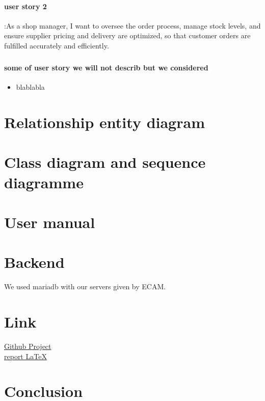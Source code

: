 \documentclass{article}
\begin{document}
\paragraph{user story 2}:As a shop manager, I want to oversee the order process, manage stock levels, and ensure supplier pricing and delivery are optimized, so that customer orders are fulfilled accurately and efficiently.
\subparagraph{}

\paragraph{some of user story we will not describ but we considered}
\begin{itemize}
    \item blablabla
\end{itemize}

\section{Relationship entity diagram}

\section{Class diagram and sequence diagramme}

\section{User manual}

\section{Backend}
We used mariadb with our servers given by ECAM.   

\section{Link}
\href{https://github.com/I42I/Kitbox_app}{Github Project}\\
\href{https://github.com/PierreLouis-23317/Software2_report/settings/access}{report LaTeX}


\section{Conclusion}
\end{document}

